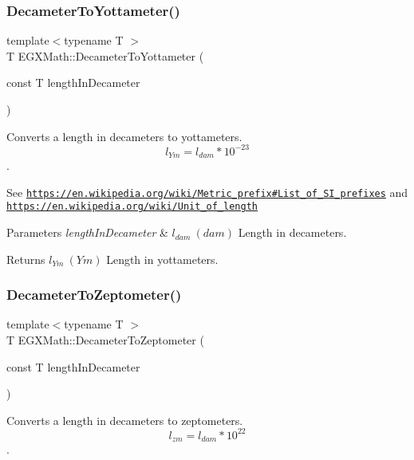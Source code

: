 \subsubsection{\texorpdfstring{Decameter\+To\+Yottameter()}{DecameterToYottameter()}}
{\footnotesize\ttfamily template$<$typename T $>$ \\
T E\+G\+X\+Math\+::\+Decameter\+To\+Yottameter (\begin{DoxyParamCaption}\item[{const T}]{length\+In\+Decameter }\end{DoxyParamCaption})}



Converts a length in decameters to yottameters. \[ l_{Ym}=l_{dam} * 10^{-23} \]. 

See \href{https://en.wikipedia.org/wiki/Metric_prefix#List_of_SI_prefixes}{\tt https\+://en.\+wikipedia.\+org/wiki/\+Metric\+\_\+prefix\#\+List\+\_\+of\+\_\+\+S\+I\+\_\+prefixes} and \href{https://en.wikipedia.org/wiki/Unit_of_length}{\tt https\+://en.\+wikipedia.\+org/wiki/\+Unit\+\_\+of\+\_\+length} 
\begin{DoxyParams}{Parameters}
{\em length\+In\+Decameter} & $ l_{dam}\ (dam)$ Length in decameters. \\
\hline
\end{DoxyParams}
\begin{DoxyReturn}{Returns}
$ l_{Ym}\ (Ym)$ Length in yottameters. 
\end{DoxyReturn}
\mbox{\label{group___e_g_x_math-_conversions-_length_conversions-_s_i-_decameter-_s_i_gaa5ec7101e385d972cd3175fab39fd2c6}} 
\subsubsection{\texorpdfstring{Decameter\+To\+Zeptometer()}{DecameterToZeptometer()}}
{\footnotesize\ttfamily template$<$typename T $>$ \\
T E\+G\+X\+Math\+::\+Decameter\+To\+Zeptometer (\begin{DoxyParamCaption}\item[{const T}]{length\+In\+Decameter }\end{DoxyParamCaption})}



Converts a length in decameters to zeptometers. \[ l_{zm}=l_{dam} * 10^{22} \]. 

